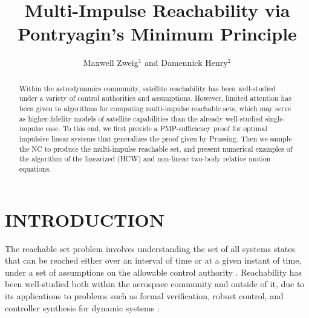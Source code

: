 \documentclass[letterpaper, 10 pt, conference]{ieeeconf}  %
\title{\LARGE \bf Multi-Impulse Reachability via Pontryagin's Minimum Principle}
\author{Maxwell Zweig$^{1}$ and Damennick Henry$^{2}$}%
\begin{document}
\maketitle
\thispagestyle{empty}
\pagestyle{empty}


\begin{abstract}
Within the astrodynamics community, satellite reachability has been well-studied under a variety of control authorities and assumptions. However, limited attention has been given to algorithms for computing multi-impulse reachable sets, which may serve as higher-fidelity models of satellite capabilities than the already well-studied single-impulse case. To this end, we first provide a PMP-sufficiency proof for optimal impulsive linear systems that generalizes the proof given by Prussing. Then we sample the NC to produce the multi-impulse reachable set, and present numerical examples of the algorithm of the linearized (HCW) and non-linear two-body relative motion equations.
\end{abstract}


\section{INTRODUCTION}
The reachable set problem involves understanding the set of all systems states that can be reached either over an interval of time or at a given instant of time, under a set of assumptions on the allowable control authority \cite{althoff2021}. Reachability has been well-studied both within the aerospace community and outside of it, due to its applications to problems such as formal verification, robust control, and controller synthesis for dynamic systems \cite{althoff2021}.
\end{document}

